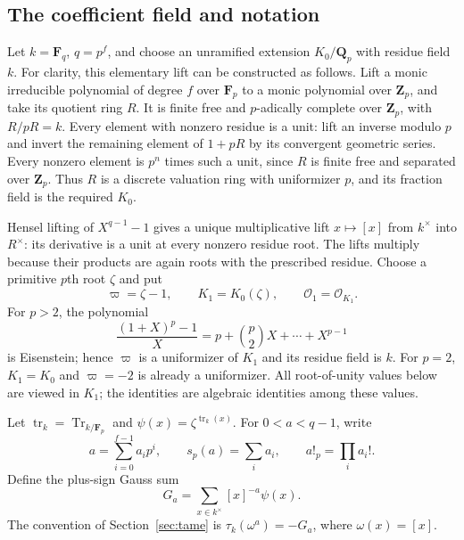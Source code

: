 \documentclass[11pt]{amsart}
\theoremstyle{definition}
\theoremstyle{remark}
\newcommand{\Q}{\mathbf Q}
\newcommand{\F}{\mathbf F}
\newcommand{\Tr}{\operatorname{Tr}}
\newcommand{\OO}{\mathcal O}\newcommand{\pp}{\mathfrak p}\newcommand{\PP}{\mathfrak P}
\begin{document}
\subsection{The coefficient field and notation}
Let $k=\F_q$, $q=p^f$, and choose an unramified extension $K_0/\Q_p$
with residue field $k$. For clarity, this elementary lift can be
constructed as follows. Lift a monic irreducible polynomial of degree $f$
over $\F_p$ to a monic polynomial over $\mathbf Z_p$, and take its
quotient ring $R$. It is finite free and $p$-adically complete over
$\mathbf Z_p$, with $R/pR=k$. Every element with nonzero residue is a
unit: lift an inverse modulo $p$ and invert the remaining element of
$1+pR$ by its convergent geometric series. Every nonzero element is
$p^n$ times such a unit, since $R$ is finite free and separated over
$\mathbf Z_p$. Thus $R$ is a discrete valuation ring with uniformizer
$p$, and its fraction field is the required $K_0$.

Hensel lifting of $X^{q-1}-1$ gives a unique multiplicative lift
$x\mapsto[x]$ from $k^\times$ into $R^\times$: its derivative is a
unit at every nonzero residue root. The lifts multiply because their
products are again roots with the prescribed residue. Choose a primitive
$p$th root $\zeta$ and put
\[
 \varpi=\zeta-1,\qquad K_1=K_0(\zeta),\qquad \OO_1=\OO_{K_1}.
\]
For $p>2$, the polynomial
\[
 \frac{(1+X)^p-1}{X}=p+\binom p2X+\cdots+X^{p-1}
\]
is Eisenstein; hence $\varpi$ is a uniformizer of $K_1$ and its residue
field is $k$. For $p=2$, $K_1=K_0$ and $\varpi=-2$ is already a
uniformizer. All root-of-unity values below are viewed in $K_1$; the
identities are algebraic identities among these values.

Let $\operatorname{tr}_k=\Tr_{k/\F_p}$ and
$\psi(x)=\zeta^{\operatorname{tr}_k(x)}$. For $0<a<q-1$, write
\[
 a=\sum_{i=0}^{f-1}a_ip^i,\qquad
 s_p(a)=\sum_i a_i,\qquad a!_p=\prod_i a_i!.
\]
Define the plus-sign Gauss sum
\[
 G_a=\sum_{x\in k^\times}[x]^{-a}\psi(x).
\]
The convention of Section~\ref{sec:tame} is
$\tau_k(\omega^a)=-G_a$, where $\omega(x)=[x]$.
\end{document}
